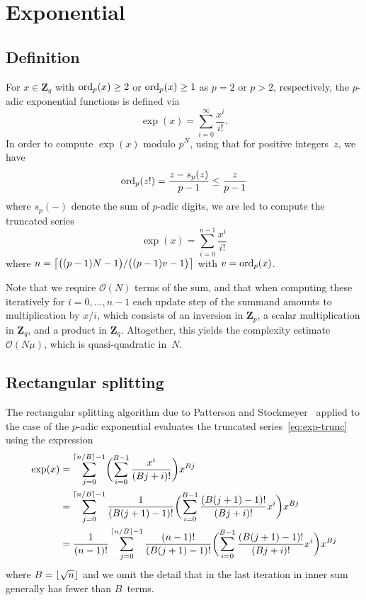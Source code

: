 \section{Exponential}

\subsection{Definition}

For $x \in \mathbf{Z}_q$ with $\operatorname{ord}_p(x) \geq 2$ or $\operatorname{ord}_p(x) \geq 1$ 
as $p=2$ or $p > 2$, respectively, the $p$-adic exponential functions is 
defined via 
\begin{equation}
\exp(x) = \sum_{i = 0}^{\infty} \frac{x^i}{i!}.
\end{equation}
In order to compute $\exp(x)$ modulo $p^N$, using that for positive 
integers~$z$, we have
\begin{equation}
\operatorname{ord}_p(z!) = \frac{z - s_p(z)}{p - 1} \leq \frac{z}{p - 1}
\end{equation}
where $s_p(-)$ denote the sum of $p$-adic digits, we are led to compute 
the truncated series 
\begin{equation} \label{eq:exp-trunc}
\exp(x) = \sum_{i = 0}^{n-1} \frac{x^i}{i!}
\end{equation}
where $n = \bigl\lceil\bigl( (p-1)N - 1 \bigr) / \bigl( (p-1)v - 1 \bigr)\bigr\rceil$ 
with $v = \operatorname{ord}_p(x)$.

Note that we require $\mathcal{O}(N)$ terms of the sum, 
and that when computing these iteratively for $i = 0, \dotsc, n-1$ 
each update step of the summand amounts to multiplication by $x / i$, 
which consists of an inversion in $\mathbf{Z}_p$, a scalar multiplication 
in $\mathbf{Z}_q$, and a product in $\mathbf{Z}_q$.  Altogether, this 
yields the complexity estimate $\mathcal{O}(N \mu)$, which is quasi-quadratic 
in~$N$.

\subsection{Rectangular splitting}

The rectangular splitting algorithm due to Patterson and 
Stockmeyer~\citep{PatersonStockmeyer1973} applied to the 
case of the $p$-adic exponential evaluates the truncated 
series~\eqref{eq:exp-trunc} using the expression 
\begin{equation}
\begin{split}
\exp(x) & = \sum_{j=0}^{\left\lceil n/B\right\rceil - 1} 
            \biggl( \sum_{i=0}^{B-1} \frac{x^i}{(Bj + i)!} \biggr) x^{Bj} \\
        & = \sum_{j=0}^{\left\lceil n/B\right\rceil - 1} 
            \frac{1}{(B (j+1) - 1)!} \biggl( \sum_{i=0}^{B-1} \frac{(B (j+1) - 1)!}{(Bj + i)!} x^i \biggr) x^{Bj} \\
        & = \frac{1}{(n-1)!} \sum_{j=0}^{\left\lceil n/B\right\rceil - 1} 
            \frac{(n-1)!}{(B (j+1) - 1)!} \biggl( \sum_{i=0}^{B-1} \frac{(B (j+1) - 1)!}{(Bj + i)!} x^i \biggr) x^{Bj}
\end{split}
\end{equation}
where $B = \lfloor\sqrt{n}\rfloor$ and we omit the detail that 
in the last iteration in inner sum generally has fewer than 
$B$~terms.

